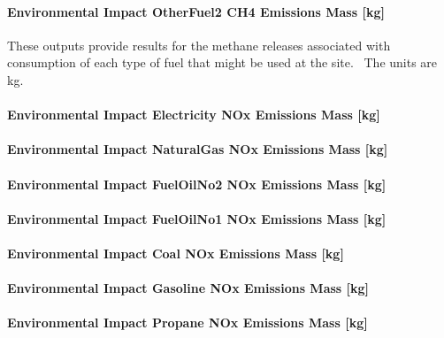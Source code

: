 \paragraph{Environmental Impact OtherFuel2 CH4 Emissions Mass {[}kg{]}}\label{environmental-impact-otherfuel2-ch4-emissions-mass-kg}

These outputs provide results for the methane releases associated with consumption of each type of fuel that might be used at the site.~ The units are kg.

\paragraph{Environmental Impact Electricity NOx Emissions Mass {[}kg{]}}\label{environmental-impact-electricity-nox-emissions-mass-kg}

\paragraph{Environmental Impact NaturalGas NOx Emissions Mass {[}kg{]}}\label{environmental-impact-natural-gas-nox-emissions-mass-kg}

\paragraph{Environmental Impact FuelOilNo2 NOx Emissions Mass {[}kg{]}}\label{environmental-impact-fuel-oil-2-nox-emissions-mass-kg}

\paragraph{Environmental Impact FuelOilNo1 NOx Emissions Mass {[}kg{]}}\label{environmental-impact-fuel-oil-1-nox-emissions-mass-kg}

\paragraph{Environmental Impact Coal NOx Emissions Mass {[}kg{]}}\label{environmental-impact-coal-nox-emissions-mass-kg}

\paragraph{Environmental Impact Gasoline NOx Emissions Mass {[}kg{]}}\label{environmental-impact-gasoline-nox-emissions-mass-kg}

\paragraph{Environmental Impact Propane NOx Emissions Mass {[}kg{]}}\label{environmental-impact-propane-nox-emissions-mass-kg}

